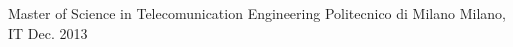 
\begin{cventries}
  \cventrynodata
    {Master of Science in Telecomunication Engineering} %
    {Politecnico di Milano} %
    {Milano, IT} %
    {Dec. 2013} %
    {}
\end{cventries}
